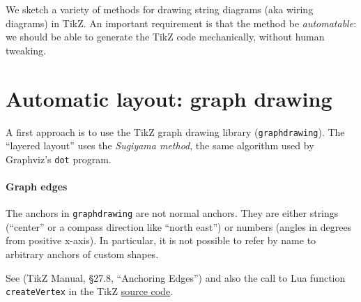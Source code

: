 \documentclass[12pt]{article}
\begin{document}
We sketch a variety of methods for drawing string diagrams (aka wiring
diagrams) in TikZ. An important requirement is that the method be
\emph{automatable}: we should be able to generate the TikZ code mechanically,
without human tweaking.

\section*{Automatic layout: graph drawing}

\usetikzlibrary{graphdrawing}
\usetikzlibrary{graphs}

A first approach is to use the TikZ graph drawing library
(\texttt{graphdrawing}). The ``layered layout'' uses the \emph{Sugiyama
  method}, the same algorithm used by Graphviz's \texttt{dot} program.

\paragraph{Graph edges}

The anchors in \texttt{graphdrawing} are not normal anchors. They are either
strings (``center'' or a compass direction like ``north east'') or numbers
(angles in  degrees from positive x-axis). In particular, it is not possible to
refer by name to arbitrary anchors of custom shapes.

See (TikZ Manual, \S 27.8, ``Anchoring Edges'') and also the call to Lua
function \texttt{createVertex} in the TikZ
\href{http://pgf.cvs.sourceforge.net/viewvc/pgf/pgf/generic/pgf/graphdrawing/tex/pgflibrarygraphdrawing.code.tex?view=markup}{source code}.

\begin{center}
\end{center}
\end{document}
